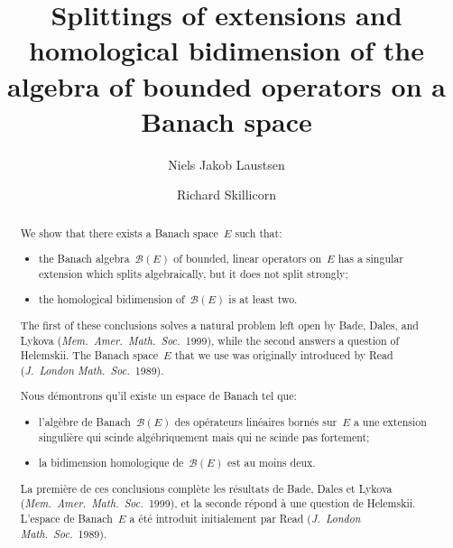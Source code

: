 \documentclass[11pt,reqno]{amsart}
\theoremstyle{definition}
\numberwithin{equation}{section}
\begin{document}
\title[Splittings of extensions and homological bidimension of
  $\mathscr{B}(E)$]{Splittings of extensions and homological
  bi\-dimen\-sion of the algebra of bounded operators on a Banach
  space}
%
\author[N.~J.~Laustsen]{Niels Jakob Laustsen} 
%
\author[R.~Skillicorn]{Richard Skillicorn} 
%
\address{Department of Mathematics and Statistics, Fylde College,
  Lancaster University, Lancaster LA1 4YF, United Kingdom.}
%
\begin{abstract}
  We show that there exists a Banach space~$E$ such that: 
  \begin{itemize}
  \item the Banach algebra~$\mathscr{B}(E)$ of bounded, linear
    operators on~$E$ has a singular extension which splits
    algebraically, but it does not split strongly;
  \item the homological bidimension of~$\mathscr{B}(E)$ is at least
    two.
  \end{itemize}
  The first of these conclusions solves a natural  problem left open by
  Bade, Dales, and Lykova (\emph{Mem.\ Amer.\ Math.\ Soc.}~1999),
  while the second answers a question of Helemskii. The Ba\-nach
  space~$E$ that we use was originally introduced by Read
  (\emph{J.~London Math.\ Soc.}~1989).

  Nous d\'{e}montrons qu'il existe un espace de Banach tel que:
  \begin{itemize}
  \item l'alg\`{e}bre de Banach~$\mathscr{B}(E)$ des op\'{e}rateurs
    lin\'{e}aires born\'{e}s sur~$E$ a une extension singuli\`{e}re
    qui scinde alg\'{e}briquement mais qui ne scinde pas fortement;
  \item la bidimension homologique de~$\mathscr{B}(E)$ est au moins
    deux.
  \end{itemize}
  La premi\`{e}re de ces conclusions compl\`{e}te les r\'{e}sultats de
  Bade, Dales et Lykova (\emph{Mem.\ Amer.\ Math.\ Soc.}~1999), et la
  seconde r\'{e}pond \`{a} une question de Helemskii.  L'espace de
  Banach~$E$ a \'{e}t\'{e} introduit initialement par Read
  (\emph{J.~London Math.\ Soc.}~1989).
\end{abstract}
%
\maketitle
%
\end{document}
